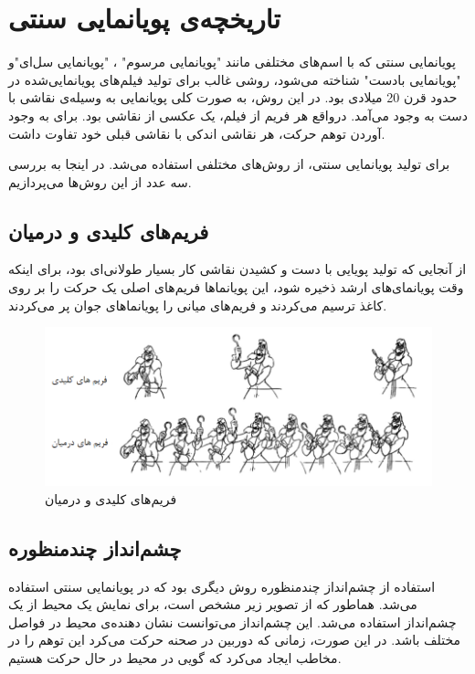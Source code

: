 \section{تاریخچه‌ی پویانمایی سنتی}

پویانمایی سنتی که با اسم‌های مختلفی مانند "پویانمایی مرسوم" ، "پویانمایی سل‌ای"و "پویانمایی بادست" شناخته می‌شود، روشی 
غالب برای تولید فیلم‌های پویانمایی‌شده در حدود قرن 20 میلادی بود.
در این روش، به صورت کلی پویانمایی به وسیله‌ی نقاشی با دست به وجود می‌‌آمد.
درواقع هر فریم از فیلم، یک عکسی از نقاشی بود.
برای به وجود آوردن توهم حرکت، هر نقاشی اندکی با نقاشی قبلی خود تفاوت داشت.

برای تولید پویانمایی سنتی، از روش‌های مختلفی استفاده می‌شد. در اینجا به بررسی
سه عدد از این روش‌ها می‌پردازیم.

\subsection{فریم‌های کلیدی و درمیان}
از آنجایی که تولید پویایی با دست و کشیدن نقاشی کار بسیار طولانی‌ای بود، برای اینکه وقت پویانمای‌های ارشد 
ذخیره شود، این پویانماها فریم‌های اصلی یک حرکت را بر روی کاغذ ترسیم می‌کردند و 
فریم‌های میانی را پویانماهای جوان پر می‌کردند.

\begin{figure}[ht]
	\centerline{\includegraphics[width=\textwidth,height=\textheight,keepaspectratio]{Figures/Ch1/KeyframeAnimation.png}}

	\caption{فریم‌های کلیدی و درمیان}
	\label{fig:KeyframeAnimation}
\end{figure}

\subsection{چشم‌انداز چندمنظوره}

استفاده از چشم‌انداز چندمنظوره روش دیگری بود که در پویانمایی سنتی استفاده می‌شد.
هماطور که از تصویر زیر مشخص است، برای نمایش یک محیط از یک چشم‌انداز استفاده می‌شد.
این چشم‌انداز می‌توانست نشان دهنده‌ی محیط در فواصل مختلف باشد. در این صورت، زمانی که 
دوربین در صحنه حرکت می‌کرد این توهم را در مخاطب ایجاد می‌کرد که گویی در محیط در حال حرکت هستیم.

